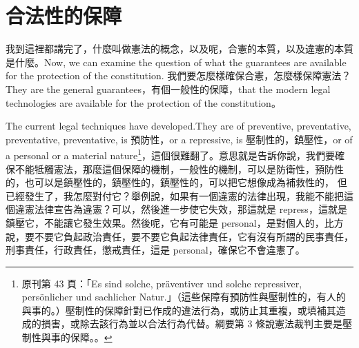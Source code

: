 \section{合法性的保障}

\hypertarget{w05:cue:124}{}我到這裡都講完了，什麼叫做憲法的概念，以及呢，合憲的本質，以及違憲的本質是什麼。Now, we can examine the question of what the guarantees are available for the protection of the constitution.
\hypertarget{w05:cue:125}{}我們要怎麼樣確保合憲，怎麼樣保障憲法？They are the general guarantees，有個一般性的保障，that the modern legal technologies are available for the protection of the constitution。

\hypertarget{w05:cue:126}{}The current legal techniques have developed.They are of preventive, preventative, preventative, preventative, is 預防性，or a repressive, is 壓制性的，鎮壓性，or of a personal or a material nature\footnote{原刊第 43 頁：「Es sind solche, präventiver und solche repressiver, persönlicher und sachlicher Natur.」（這些保障有預防性與壓制性的，有人的與事的。）壓制性的保障針對已作成的違法行為，或防止其重複，或填補其造成的損害，或除去該行為並以合法行為代替。綱要第 3 條說憲法裁判主要是壓制性與事的保障。\cite[43]{kelsen1929}。}，這個很難翻了。意思就是告訴你說，我們要確保不能牴觸憲法，那麼這個保障的機制，一般性的機制，可以是防衛性，預防性的，也可以是鎮壓性的，鎮壓性的，鎮壓性的，可以把它想像成為補救性的，
\hypertarget{w05:cue:127}{}但已經發生了，我怎麼對付它？舉例說，如果有一個違憲的法律出現，我能不能把這個違憲法律宣告為違憲？可以，然後進一步使它失效，那這就是 repress，這就是鎮壓它，不能讓它發生效果。然後呢，它有可能是 personal，是對個人的，比方說，要不要它負起政治責任，要不要它負起法律責任，它有沒有所謂的民事責任，刑事責任，行政責任，懲戒責任，這是 personal，確保它不會違憲了。

